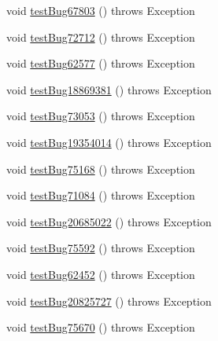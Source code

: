 \begin{DoxyCompactItemize}
\item 
void \mbox{\hyperlink{classtestsuite_1_1regression_1_1_connection_regression_test_a4ac113ac44c3a4432d84e3a3c062da8f}{test\+Bug67803}} ()  throws Exception 
\item 
void \mbox{\hyperlink{classtestsuite_1_1regression_1_1_connection_regression_test_a5b26e8f9f7cdbfaf8bb96f0f4bf42f5d}{test\+Bug72712}} ()  throws Exception 
\item 
void \mbox{\hyperlink{classtestsuite_1_1regression_1_1_connection_regression_test_ae350fa13fa69dbd3f3a7e5b23ee15503}{test\+Bug62577}} ()  throws Exception 
\item 
void \mbox{\hyperlink{classtestsuite_1_1regression_1_1_connection_regression_test_a3a33e5e8b287fe162fdfc5ae872b7b4b}{test\+Bug18869381}} ()  throws Exception 
\item 
void \mbox{\hyperlink{classtestsuite_1_1regression_1_1_connection_regression_test_a264deb8ed8bb847ac786dbb4fd6ebb19}{test\+Bug73053}} ()  throws Exception 
\item 
void \mbox{\hyperlink{classtestsuite_1_1regression_1_1_connection_regression_test_a3eea52c252e252b39fbfb93bcc80d26a}{test\+Bug19354014}} ()  throws Exception 
\item 
void \mbox{\hyperlink{classtestsuite_1_1regression_1_1_connection_regression_test_a481102d0bf994ee0a48b67f1a1328c43}{test\+Bug75168}} ()  throws Exception 
\item 
void \mbox{\hyperlink{classtestsuite_1_1regression_1_1_connection_regression_test_aa979b5c63116b99ad91121c84a0af973}{test\+Bug71084}} ()  throws Exception 
\item 
void \mbox{\hyperlink{classtestsuite_1_1regression_1_1_connection_regression_test_a1a63a52aeb982d168ebee3c0cb30bc59}{test\+Bug20685022}} ()  throws Exception 
\item 
void \mbox{\hyperlink{classtestsuite_1_1regression_1_1_connection_regression_test_a665407a24ed690a64058e8f86c4d6063}{test\+Bug75592}} ()  throws Exception 
\item 
void \mbox{\hyperlink{classtestsuite_1_1regression_1_1_connection_regression_test_a622960dd50328718a00cdad9f046f1d9}{test\+Bug62452}} ()  throws Exception 
\item 
void \mbox{\hyperlink{classtestsuite_1_1regression_1_1_connection_regression_test_a90f5472dadf388f9b00461fc39ddeb21}{test\+Bug20825727}} ()  throws Exception 
\item 
void \mbox{\hyperlink{classtestsuite_1_1regression_1_1_connection_regression_test_ae51a7e49df56ea469720a9d165fc124a}{test\+Bug75670}} ()  throws Exception 

\end{DoxyCompactItemize}
